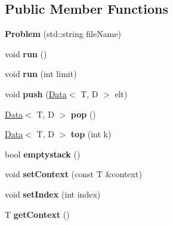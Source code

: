 \subsection*{Public Member Functions}
\begin{DoxyCompactItemize}
\item 
{\bfseries Problem} (std\+::string file\+Name)\hypertarget{class_problem_a12573e7fe2b81d50f5c1cdeef3c40aab}{}\label{class_problem_a12573e7fe2b81d50f5c1cdeef3c40aab}

\item 
void {\bfseries run} ()\hypertarget{class_problem_a8ce5fef9d031d039f1108e2c8e37dc0c}{}\label{class_problem_a8ce5fef9d031d039f1108e2c8e37dc0c}

\item 
void {\bfseries run} (int limit)\hypertarget{class_problem_ac005fa3508b7919a0dfe8a27674e1e88}{}\label{class_problem_ac005fa3508b7919a0dfe8a27674e1e88}

\item 
void {\bfseries push} (\hyperlink{class_data}{Data}$<$ T, D $>$ elt)\hypertarget{class_problem_a0646d0ab10243ede1bfd8d20c87ebb21}{}\label{class_problem_a0646d0ab10243ede1bfd8d20c87ebb21}

\item 
\hyperlink{class_data}{Data}$<$ T, D $>$ {\bfseries pop} ()\hypertarget{class_problem_acbf710851a036b2602d32190cdf2ba89}{}\label{class_problem_acbf710851a036b2602d32190cdf2ba89}

\item 
\hyperlink{class_data}{Data}$<$ T, D $>$ {\bfseries top} (int k)\hypertarget{class_problem_aad2184ad1ce770cce1d9008435bb4055}{}\label{class_problem_aad2184ad1ce770cce1d9008435bb4055}

\item 
bool {\bfseries emptystack} ()\hypertarget{class_problem_a8393e40932145b955883cf422091d964}{}\label{class_problem_a8393e40932145b955883cf422091d964}

\item 
void {\bfseries set\+Context} (const T \&context)\hypertarget{class_problem_ad9e49e1c165929877f159f51ce7bd040}{}\label{class_problem_ad9e49e1c165929877f159f51ce7bd040}

\item 
void {\bfseries set\+Index} (int index)\hypertarget{class_problem_a96a72225d5c9a7897551d08646b9c2ae}{}\label{class_problem_a96a72225d5c9a7897551d08646b9c2ae}

\item 
T {\bfseries get\+Context} ()\hypertarget{class_problem_ad863a03e7d0b6f1e1fa8fd1eef9d5b74}{}\label{class_problem_ad863a03e7d0b6f1e1fa8fd1eef9d5b74}


\end{DoxyCompactItemize}
